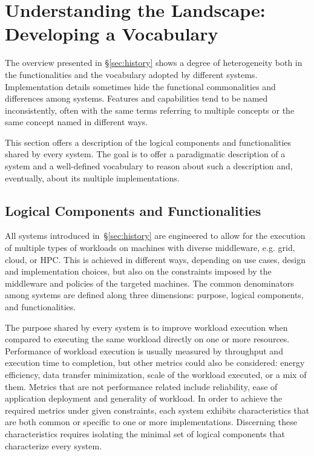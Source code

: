 \documentclass{sig-alternate}
\begin{document}
\section{Understanding the Landscape: Developing a Vocabulary}
\label{sec:understanding}

The overview presented in \S\ref{sec:history} shows a degree of heterogeneity
both in the functionalities and the vocabulary adopted by different \pilotjob
systems. Implementation details sometimes hide the functional commonalities and
differences among \pilotjob systems. Features and capabilities tend to be named
inconsistently, often with the same terms referring to multiple concepts or the
same concept named in different ways.

This section offers a description of the logical components and functionalities
shared by every \pilotjob system. The goal is to offer a paradigmatic
description of a \pilotjob system and a well-defined vocabulary to reason about
such a description and, eventually, about its multiple implementations.


\subsection{Logical Components and Functionalities}
\label{sec:compsandfuncs}

All \pilotjob systems introduced in~\S\ref{sec:history} are engineered to allow
for the execution of multiple types of workloads on machines with diverse
middleware, e.g. grid, cloud, or HPC. This is achieved in different ways,
depending on use cases, design and implementation choices, but also on the
constraints imposed by the middleware and policies of the targeted machines. The
common denominators among \pilotjob systems are defined along three dimensions:
purpose, logical components, and functionalities.

The purpose shared by every \pilotjob system is to improve workload execution
when compared to executing the same workload directly on one or more resources.
Performance of workload execution is usually measured by throughput and
execution time to completion, but other metrics could also be considered: energy
efficiency, data transfer minimization, scale of the workload executed, or a mix
of them. Metrics that are not performance related include reliability, ease of
application deployment and generality of workload.  In order to achieve the
required metrics under given constraints, each \pilotjob system exhibits
characteristics that are both common or specific to one or more implementations.
Discerning these characteristics requires isolating the minimal set of logical
components that characterize every \pilotjob system.
\end{document}
